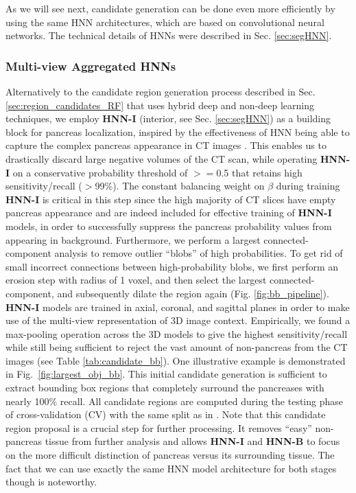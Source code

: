 \documentclass[journal]{IEEEtran}
\begin{document}
As we will see next, candidate generation can be done even more efficiently by using the same HNN architectures, which are based on convolutional neural networks. The technical details of HNNs were described in Sec. \ref{sec:segHNN}. 
\subsubsection{Multi-view Aggregated HNNs}\label{sec:localizationHNN}
\label{sec:region_candidates} 
Alternatively to the candidate region generation process described in Sec. \ref{sec:region_candidates_RF} that uses hybrid deep and non-deep learning techniques, we employ \textbf{HNN-I} (interior, see Sec. \ref{sec:segHNN}) as a building block for pancreas localization, inspired by the effectiveness of HNN being able to capture the complex pancreas appearance in CT images \cite{roth2016spatial}. This enables us to drastically discard large negative volumes of the CT scan, while operating \textbf{HNN-I} on a conservative probability threshold of $>=$0.5 that retains high sensitivity/recall ($>$99\%). The constant balancing weight on $\beta$ during training \textbf{HNN-I} is critical in this step since the high majority of CT slices have empty pancreas appearance and are indeed included for effective training of \textbf{HNN-I} models, in order to successfully suppress the pancreas probability values from appearing in background. 
Furthermore, we perform a largest connected-component analysis to remove outlier ``blobs'' of high probabilities. To get rid of small incorrect connections between high-probability blobs, we first perform an erosion step with radius of 1 voxel, and then select the largest connected-component, and subsequently dilate the region again (Fig. \ref{fig:bb_pipeline}). 
\textbf{HNN-I} models are trained in axial, coronal, and sagittal planes in order to make use of the multi-view representation of 3D image context. Empirically, we found a max-pooling operation across the 3D models to give the highest sensitivity/recall while still being sufficient to reject the vast amount of non-pancreas from the CT images (see Table \ref{tab:candidate_bb}). One illustrative example is demonstrated in Fig.~\ref{fig:largest_obj_bb}.
This initial candidate generation is sufficient to extract bounding box regions that completely surround the pancreases with nearly 100\% recall. All candidate regions are computed during the testing phase of cross-validation (CV) with the same split as in \cite{roth2015deeporgan}. 
Note that this candidate region proposal is a crucial step for further processing. It removes ``easy'' non-pancreas tissue from further analysis and allows \textbf{HNN-I} and \textbf{HNN-B} to focus on  the more difficult distinction of pancreas versus its surrounding tissue. The fact that we can use exactly the same HNN model architecture for both stages though is noteworthy.
\end{document}
